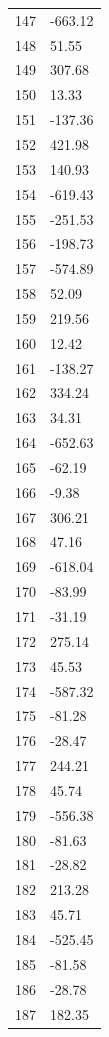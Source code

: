 \documentclass[a4paper,11pt]{article}
\begin{document}
\begin{center}
\begin{longtable}{|R{1.5cm}|R{2.5cm}|}
  147 &      -663.12 \\
  148 &        51.55 \\
  149 &       307.68 \\
  150 &        13.33 \\
  151 &      -137.36 \\
  152 &       421.98 \\
  153 &       140.93 \\
  154 &      -619.43 \\
  155 &      -251.53 \\
  156 &      -198.73 \\
  157 &      -574.89 \\
  158 &        52.09 \\
  159 &       219.56 \\
  160 &        12.42 \\
  161 &      -138.27 \\
  162 &       334.24 \\
  163 &        34.31 \\
  164 &      -652.63 \\
  165 &       -62.19 \\
  166 &        -9.38 \\
  167 &       306.21 \\
  168 &        47.16 \\
  169 &      -618.04 \\
  170 &       -83.99 \\
  171 &       -31.19 \\
  172 &       275.14 \\
  173 &        45.53 \\
  174 &      -587.32 \\
  175 &       -81.28 \\
  176 &       -28.47 \\
  177 &       244.21 \\
  178 &        45.74 \\
  179 &      -556.38 \\
  180 &       -81.63 \\
  181 &       -28.82 \\
  182 &       213.28 \\
  183 &        45.71 \\
  184 &      -525.45 \\
  185 &       -81.58 \\
  186 &       -28.78 \\
  187 &       182.35 \\

\end{longtable}
\end{center}
\end{document}
